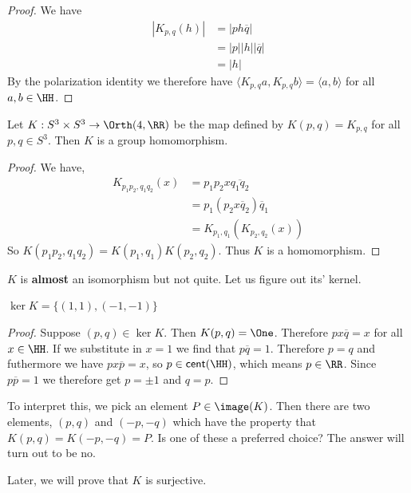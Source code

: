 \begin{proof}
    We have \begin{align*}
        |K_{p,q}(h)| &= |ph\overline{q}|\\
        &= |p||h||\overline{q}|\\
        &= |h|
    \end{align*}
    By the polarization identity we therefore have $\langle K_{p,q}a,K_{p,q}b\rangle = \langle a,b\rangle$ for all $a,b\in\HH$.
\end{proof}
\begin{lemma}
    Let $K : S^3 \times S^3 \to \Orth(4,\RR)$ be the map defined by $K(p,q) = K_{p,q}$ for all $p,q\in S^3$. Then $K$ is a group homomorphism.
\end{lemma}
\begin{proof}
    We have,
    \begin{align*}
        K_{p_1p_2,q_1q_2}(x) &= p_1p_2x\overline{q_1q_2}\\
        &= p_1(p_2x\overline{q}_2)\overline{q}_1\\
        &= K_{p_1,q_1}(K_{p_2,q_2}(x))
    \end{align*}
    So $K(p_1p_2,q_1q_2) = K(p_1,q_1)K(p_2,q_2)$. Thus $K$ is a homomorphism.
\end{proof}
\begin{remark*}
    $K$ is \textbf{almost} an isomorphism but not quite. Let us figure out its' kernel.
\end{remark*}
\begin{lemma}
    $\ker K = \{(1,1),(-1,-1)\}$
\end{lemma}
\begin{proof}
    Suppose $(p,q)\in \ker K$. Then $K(p,q) = \One$. Therefore $px\overline{q} = x$ for all $x\in \HH$. If we substitute in $x=1$ we find that $p\overline{q}=1$. Therefore $p=q$ and futhermore we have $px\overline{p} = x$, so $p \in \textsf{cent}(\HH)$, which means $p \in \RR$. Since $p\overline{p}=1$ we therefore get $p = \pm 1$ and $q=p$.
\end{proof}
\begin{remark*}
    To interpret this, we pick an element $P \in \image(K)$. Then there are two elements, $(p,q)$ and $(-p,-q)$ which have the property that $K(p,q)=K(-p,-q)=P$. Is one of these a preferred choice? The answer will turn out to be no. 
\end{remark*}
\begin{remark*}
    Later, we will prove that $K$ is surjective.
\end{remark*}
